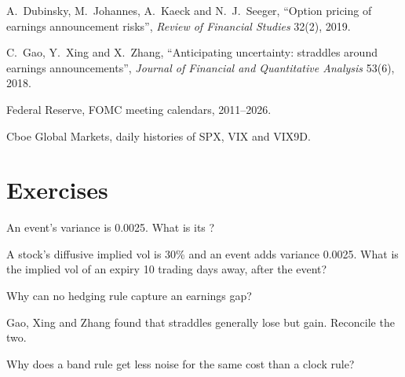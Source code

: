 \begin{omsources}
\item A.~Dubinsky, M.~Johannes, A.~Kaeck and N.~J.~Seeger, ``Option pricing of earnings announcement risks'', \emph{Review of Financial Studies}
32(2), 2019.
\item C.~Gao, Y.~Xing and X.~Zhang, ``Anticipating uncertainty: straddles around earnings announcements'', \emph{Journal of Financial and Quantitative
Analysis} 53(6), 2018.
\item Federal Reserve, FOMC meeting calendars, 2011--2026.
\item Cboe Global Markets, daily histories of SPX, VIX and VIX9D.
\end{omsources}

\section{Exercises}

\begin{exercise}[$\star$]\label{exo:s2:gamma-scalping-and-event-volatility:1}
An event's variance is 0.0025. What is its ?
\end{exercise}

\begin{exercise}[$\star$]\label{exo:s2:gamma-scalping-and-event-volatility:2}
A stock's diffusive implied vol is 30\% and an event adds variance 0.0025. What is the implied vol of an expiry 10 trading days away, after the event?
\end{exercise}

\begin{exercise}[$\star$]\label{exo:s2:gamma-scalping-and-event-volatility:3}
Why can no hedging rule capture an earnings gap?
\end{exercise}

\begin{exercise}[$\star\star$]\label{exo:s2:gamma-scalping-and-event-volatility:4}
Gao, Xing and Zhang found that straddles generally lose but  gain. Reconcile the two.
\end{exercise}

\begin{exercise}[$\star\star$]\label{exo:s2:gamma-scalping-and-event-volatility:5}
Why does a band rule get less noise for the same cost than a clock rule?
\end{exercise}

